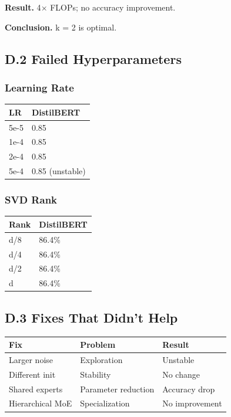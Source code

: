\textbf{Result.} 4$\times$ FLOPs; no accuracy improvement.

\textbf{Conclusion.} k = 2 is optimal.

\subsection{D.2 Failed Hyperparameters}

\subsubsection{Learning Rate}

\begin{table}[H]
\centering
\small
\begin{tabular}{ll}
\toprule
\textbf{LR} & \textbf{DistilBERT} \\
\midrule
5e-5 & 0.85 \\
1e-4 & 0.85 \\
2e-4 & 0.85 \\
5e-4 & 0.85 (unstable) \\
\bottomrule
\end{tabular}
\end{table}

\subsubsection{SVD Rank}

\begin{table}[H]
\centering
\small
\begin{tabular}{ll}
\toprule
\textbf{Rank} & \textbf{DistilBERT} \\
\midrule
d/8 & 86.4\% \\
d/4 & 86.4\% \\
d/2 & 86.4\% \\
d & 86.4\% \\
\bottomrule
\end{tabular}
\end{table}

\subsection{D.3 Fixes That Didn't Help}

\begin{table}[H]
\centering
\small
\begin{tabular}{lll}
\toprule
\textbf{Fix} & \textbf{Problem} & \textbf{Result} \\
\midrule
Larger noise & Exploration & Unstable \\
Different init & Stability & No change \\
Shared experts & Parameter reduction & Accuracy drop \\
Hierarchical MoE & Specialization & No improvement \\
\bottomrule
\end{tabular}
\end{table}

